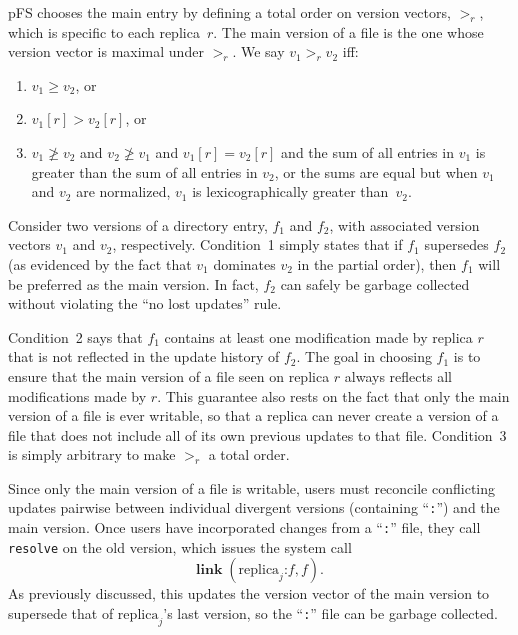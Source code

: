 pFS chooses the main entry by defining a total order on version
vectors, $>_r$, which is specific to each replica~$r$.  The main
version of a file is the one whose version vector is maximal under
$>_r$.  We say $v_1>_rv_2$ iff:
\begin{enumerate}
\item $v_1\ge v_2$, or
\item $v_1[r]>v_2[r]$, or
\item $v_1\not\ge v_2$ and $v_2\not\ge v_1$ and $v_1[r]=v_2[r]$ and
  the sum of all entries in $v_1$ is greater than the sum of all
  entries in $v_2$, or the sums are equal but when $v_1$ and $v_2$ are
  normalized, $v_1$ is lexicographically greater than~$v_2$.
\end{enumerate}

Consider two versions of a directory entry, $f_1$ and $f_2$, with
associated version vectors $v_1$ and $v_2$, respectively.  Condition~1
simply states that if $f_1$ supersedes $f_2$ (as evidenced by the fact
that $v_1$ dominates $v_2$ in the partial order), then $f_1$ will be
preferred as the main version.  In fact, $f_2$ can safely be garbage
collected without violating the ``no lost updates'' rule.

Condition~2 says that $f_1$ contains at least one modification made by
replica $r$ that is not reflected in the update history of $f_2$.  The
goal in choosing $f_1$ is to ensure that the main version of a file
seen on replica $r$ always reflects all modifications made by $r$.
This guarantee also rests on the fact that only the main version of a
file is ever writable, so that a replica can never create a version of
a file that does not include all of its own previous updates to that
file.  Condition~3 is simply arbitrary to make $>_r$ a total order.

Since only the main version of a file is writable, users must
reconcile conflicting updates pairwise between individual divergent
versions (containing ``\texttt{:}'') and the main version.  Once users
have incorporated changes from a ``\texttt{:}'' file, they call
\texttt{resolve} on the old version, which issues the system call
$$\mathbf{link}\; (\mathrm{replica}_j\texttt{:}f, f).$$
As previously discussed, this updates the version vector of the main
version to supersede that of $\mathrm{replica}_j$'s last version, so
the ``\texttt{:}'' file can be garbage collected.

